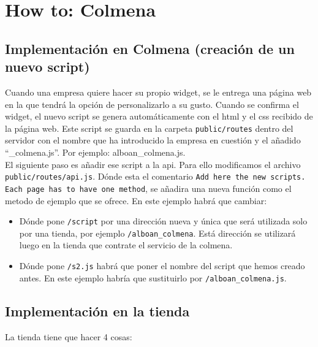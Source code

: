 \section{How to: Colmena}

\subsection{Implementación en Colmena (creación de un nuevo script)}
Cuando una empresa quiere hacer su propio widget, se le entrega una página web en la que tendrá la opción de personalizarlo a su gusto. Cuando se confirma el widget, el nuevo script se genera automáticamente con el html y el css recibido de la página web. Este script se guarda en la carpeta \texttt{public/routes} dentro del servidor con el nombre que ha introducido la empresa en cuestión y el añadido “\_colmena.js”. Por ejemplo: alboan\_colmena.js. \\

El siguiente paso es añadir ese script a la api. Para ello modificamos el archivo \\
\texttt{public/routes/api.js}. Dónde esta el comentario \texttt{Add here the new scripts. Each page has to have one method}, se añadira una nueva función como el metodo de ejemplo que se ofrece. En este ejemplo habrá que cambiar:


\begin{itemize}
	\item Dónde pone \texttt{/script} por una dirección nueva y única que será utilizada solo por una tienda, por ejemplo \texttt{/alboan\_colmena}. Está dirección se utilizará luego en la tienda que contrate el	servicio de la colmena.
	\item Dónde pone \texttt{/s2.js} habrá que poner el nombre del script que hemos creado antes. En este
	ejemplo habría que sustituirlo por \texttt{/alboan\_colmena.js}.
\end{itemize}


\subsection{Implementación en la tienda}

La tienda tiene que hacer 4 cosas:

